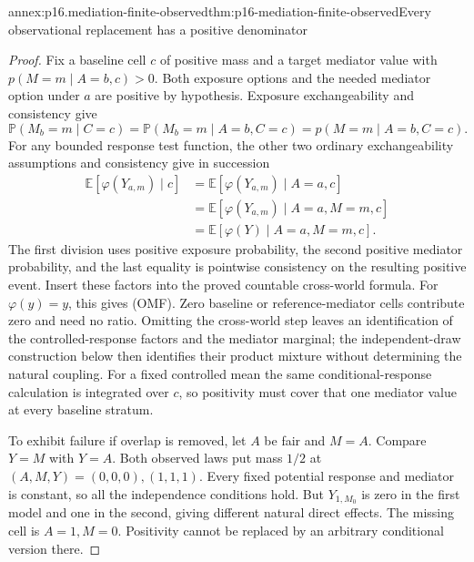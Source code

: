 \begin{annexitem}{annex:p16.mediation-finite-observed}{thm:p16-mediation-finite-observed}{Every observational replacement has a positive denominator}
\begin{proof}
Fix a baseline cell \(c\) of positive mass and a target mediator value
with \(p(M=m\mid A=b,c)>0\). Both exposure options and the needed
mediator option under \(a\) are positive by hypothesis. Exposure
exchangeability and consistency give
\[
 \mathbb P(M_b=m\mid C=c)
 =\mathbb P(M_b=m\mid A=b,C=c)
 =p(M=m\mid A=b,C=c).
\]
For any bounded response test function, the other two ordinary
exchangeability assumptions and consistency give in succession
\[
\begin{aligned}
 \mathbb E[\varphi(Y_{a,m})\mid c]
 &=\mathbb E[\varphi(Y_{a,m})\mid A=a,c]\\
 &=\mathbb E[\varphi(Y_{a,m})\mid A=a,M=m,c]\\
 &=\mathbb E[\varphi(Y)\mid A=a,M=m,c].
\end{aligned}
\]
The first division uses positive exposure probability, the second
positive mediator probability, and the last equality is pointwise
consistency on the resulting positive event. Insert these factors into
the proved countable cross-world formula. For \(\varphi(y)=y\), this
gives (OMF). Zero baseline or reference-mediator cells contribute zero
and need no ratio. Omitting the cross-world step leaves an identification
of the controlled-response factors and the mediator marginal; the
independent-draw construction below then identifies their product
mixture without determining the natural coupling. For a fixed controlled
mean the same conditional-response calculation is integrated over \(c\),
so positivity must cover that one mediator value at every baseline stratum.

To exhibit failure if overlap is removed, let \(A\) be fair and
\(M=A\). Compare \(Y=M\) with \(Y=A\). Both observed laws put
mass \(1/2\) at \((A,M,Y)=(0,0,0),(1,1,1)\). Every fixed
potential response and mediator is constant, so all the independence
conditions hold. But \(Y_{1,M_0}\) is zero in the first model and one
in the second, giving different natural direct effects. The missing
cell is \(A=1,M=0\). Positivity cannot be replaced by an arbitrary
conditional version there.
\end{proof}
\end{annexitem}

